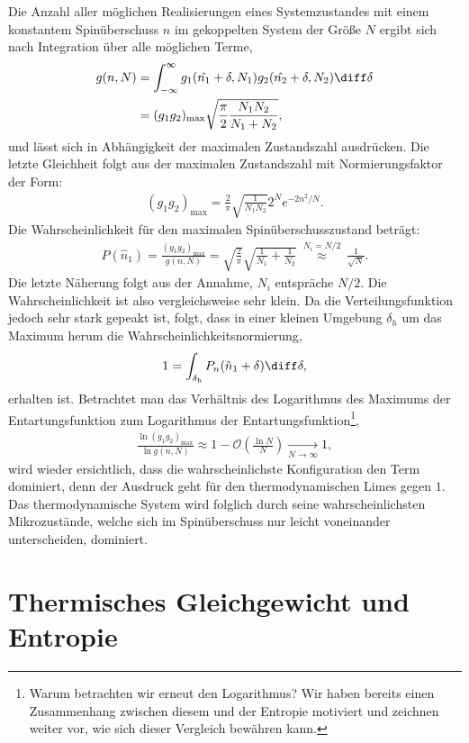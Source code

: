 Die Anzahl aller möglichen Realisierungen eines Systemzustandes mit einem konstantem Spinüberschuss $n$ im gekoppelten System der Größe $N$ ergibt sich nach Integration über alle möglichen Terme,
\begin{align*}
    g(n,N)&=\int_{-\infty}^{\infty}g_1(\hat{n_1}+\delta,N_1)g_2(\hat{n_2}+\delta,N_2)\diff\delta\\&=
    (g_1g_2)_\mathrm{max}\sqrt{\frac{\pi}{2}\frac{N_1N_2}{N_1+N_2}},
\end{align*}
und lässt sich in Abhängigkeit der maximalen Zustandszahl ausdrücken. Die letzte Gleichheit folgt aus der maximalen Zustandszahl mit Normierungsfaktor der Form:
\begin{align*}
    (g_1g_2)_\mathrm{max}=\frac{2}{\pi}\sqrt{\frac{1}{N_1N_2}}2^Ne^{-2n^2/N}.
\end{align*}
Die Wahrscheinlichkeit für den maximalen Spinüberschusszustand beträgt:
\begin{align*}
    P(\hat{n}_1)=\frac{(g_1g_2)_\mathrm{max}}{g(n,N)}=\sqrt{\frac{2}{\pi}}\sqrt{\frac{1}{N_1}+\frac{1}{N_2}}\:\overset{N_i=N/2}{\approx}\:\frac{1}{\sqrt{N}}.
\end{align*}
Die letzte Näherung folgt aus der Annahme, $N_i$ entspräche $N/2$. Die Wahrscheinlichkeit ist also vergleichsweise sehr klein. Da die Verteilungsfunktion jedoch sehr stark gepeakt ist, folgt, dass in einer kleinen Umgebung $\delta_h$ um das Maximum herum die Wahrscheinlichkeitsnormierung,
\begin{align*}
    1=\int_\mathrm{\delta_h} P_n(\hat{n}_1+\delta)\diff \delta,
\end{align*}
erhalten ist.
Betrachtet man das Verhältnis des Logarithmus des Maximums der Entartungsfunktion zum Logarithmus der Entartungsfunktion\footnote{Warum betrachten wir erneut den Logarithmus? Wir haben bereits einen Zusammenhang zwischen diesem und der Entropie motiviert und zeichnen weiter vor, wie sich dieser Vergleich bewähren kann.},
\begin{align*}
    \frac{\ln(g_1g_2)_\mathrm{max}}{\ln g(n,N)}\approx 1-\mathcal{O}\left(\frac{\ln N}{N}\right)\underset{N\rightarrow\infty}{\rightarrow}1,
\end{align*}
wird wieder ersichtlich, dass die wahrscheinlichste Konfiguration den Term dominiert, denn der Ausdruck geht für den thermodynamischen Limes gegen $1$. Das thermodynamische System wird folglich durch seine wahrscheinlichsten Mikrozustände, welche sich im Spinüberschuss nur leicht voneinander unterscheiden, dominiert. 
\section{Thermisches Gleichgewicht und Entropie}
